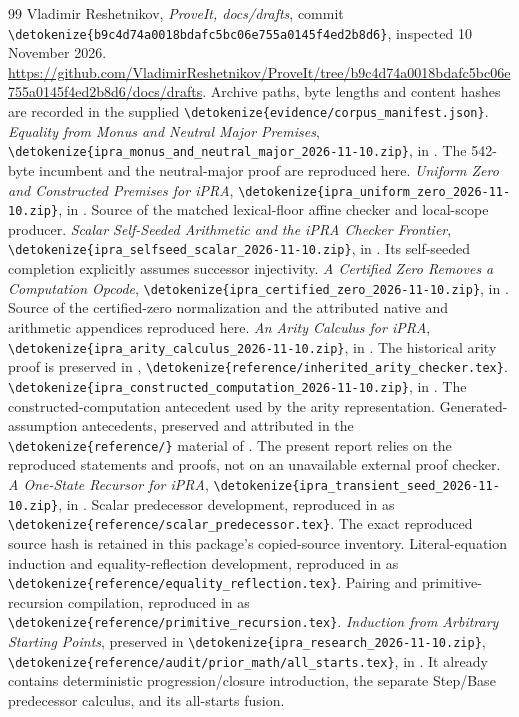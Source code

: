 \documentclass[11pt,letterpaper]{article}
\theoremstyle{definition}\newtheorem{definition}[theorem]{Definition}
\theoremstyle{remark}\newtheorem{remark}[theorem]{Remark}
\newcommand{\file}[1]{\expandafter\nolinkurl\expandafter{\detokenize{#1}}}
\begin{document}
\clearpage
\begin{thebibliography}{99}
Vladimir Reshetnikov, \emph{ProveIt, docs/drafts}, commit
\file{b9c4d74a0018bdafc5bc06e755a0145f4ed2b8d6}, inspected 10 November 2026.
\url{https://github.com/VladimirReshetnikov/ProveIt/tree/b9c4d74a0018bdafc5bc06e755a0145f4ed2b8d6/docs/drafts}.
Archive paths, byte lengths and content hashes are recorded in the supplied
\file{evidence/corpus_manifest.json}.
\emph{Equality from Monus and Neutral Major Premises},
\file{ipra_monus_and_neutral_major_2026-11-10.zip}, in \cite{corpus}.
The 542-byte incumbent and the neutral-major proof are reproduced here.
\emph{Uniform Zero and Constructed Premises for iPRA},
\file{ipra_uniform_zero_2026-11-10.zip}, in \cite{corpus}.
Source of the matched lexical-floor affine checker and local-scope producer.
\emph{Scalar Self-Seeded Arithmetic and the iPRA Checker Frontier},
\file{ipra_selfseed_scalar_2026-11-10.zip}, in \cite{corpus}.
Its self-seeded completion explicitly assumes successor injectivity.
\emph{A Certified Zero Removes a Computation Opcode},
\file{ipra_certified_zero_2026-11-10.zip}, in \cite{corpus}.
Source of the certified-zero normalization and the attributed native and
arithmetic appendices reproduced here.
\emph{An Arity Calculus for iPRA},
\file{ipra_arity_calculus_2026-11-10.zip}, in \cite{corpus}.
The historical arity proof is preserved in \cite{certified},
\file{reference/inherited_arity_checker.tex}.
\file{ipra_constructed_computation_2026-11-10.zip}, in \cite{corpus}.
The constructed-computation antecedent used by the arity representation.
Generated-assumption antecedents, preserved and attributed in the
\file{reference/} material of \cite{certified,constructed}.
The present report relies on the reproduced statements and proofs,
not on an unavailable external proof checker.
\emph{A One-State Recursor for iPRA},
\file{ipra_transient_seed_2026-11-10.zip}, in \cite{corpus}.
Scalar predecessor development, reproduced in \cite{certified} as
\file{reference/scalar_predecessor.tex}. The exact reproduced source
hash is retained in this package's copied-source inventory.
Literal-equation induction and equality-reflection development,
reproduced in \cite{certified} as \file{reference/equality_reflection.tex}.
Pairing and primitive-recursion compilation, reproduced in
\cite{certified} as \file{reference/primitive_recursion.tex}.
\emph{Induction from Arbitrary Starting Points}, preserved in
\file{ipra_research_2026-11-10.zip},
\file{reference/audit/prior_math/all_starts.tex}, in \cite{corpus}.
It already contains deterministic progression/closure introduction, the
separate Step/Base predecessor calculus, and its all-starts fusion.
\end{thebibliography}
\end{document}
